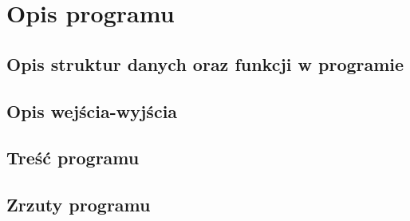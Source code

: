 \documentclass[11pt]{article} %
\begin{document}
\section{Opis programu}
\subsection{Opis struktur danych oraz funkcji w programie}
\subsection{Opis wejścia-wyjścia}
\subsection{Treść programu}
\subsection{Zrzuty programu}
\end{document}
